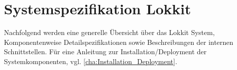 \chapter{Systemspezifikation Lokkit}
\label{cha:Systemspezifikation}
Nachfolgend werden eine generelle Übersicht über das Lokkit System, Komponentenweise Detailspezifikationen sowie Beschreibungen der internen Schnittstellen. Für eine Anleitung zur Installation/Deployment der Systemkomponenten, vgl. \ref{cha:Installation_Deployment}.




